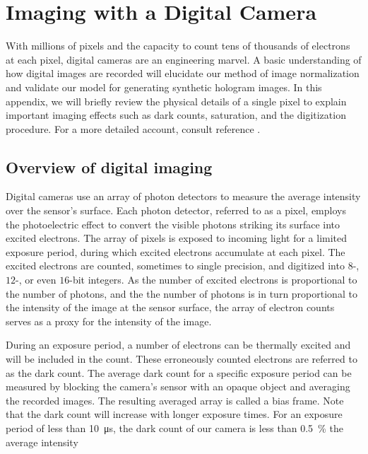 \SkipTocEntry\chapter{Imaging with a Digital Camera} 
\label{app:digital_imaging}

With millions of pixels and the capacity to count tens of thousands of electrons
at each pixel, digital cameras are an engineering marvel. 
A basic understanding of how digital images are recorded will elucidate
our method of image normalization and validate our model for generating synthetic
hologram images. In this appendix, we will briefly review the physical
details of a single pixel to explain important imaging effects such as
dark counts, saturation, and the digitization procedure. For a more detailed account,
consult reference \cite{nakamura2017}.

\section{Overview of digital imaging}

Digital cameras use an array of photon detectors to measure the
average intensity over the sensor's surface. Each photon detector, referred to as a pixel,
employs the photoelectric effect to convert the visible photons striking its surface into
excited electrons. The array of pixels is exposed to incoming light for a limited
exposure period, during which excited electrons accumulate at each pixel.
The excited electrons are counted, sometimes to single precision,
and digitized into $8$-, $12$-, or even $16$-bit integers. As the number of
excited electrons is proportional to the number of photons, and the the number of
photons is in turn proportional to the intensity of the image at the
sensor surface, the array of electron counts serves as a proxy for
the intensity of the image.

During an exposure period, a number of electrons can be thermally excited and
will be included in the count. These erroneously counted electrons are referred to
as the dark count. The average dark count for a specific exposure period can be measured
by blocking the camera's sensor with an opaque object and averaging the
recorded images. The resulting averaged array is called a bias frame. Note that the dark count will increase with
longer exposure times. For an exposure period of less than \SI{10}{\us}, the dark
count of our camera is less than \SI{0.5}{\percent} the average intensity 



